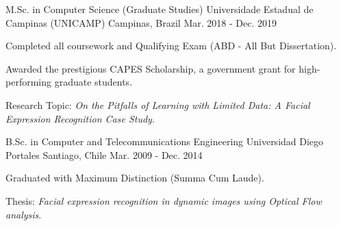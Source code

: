 
\begin{cventries}

\cventry
{M.Sc. in Computer Science (Graduate Studies)} %
{Universidade Estadual de Campinas (UNICAMP)} %
{Campinas, Brazil} %
{Mar. 2018 - Dec. 2019} %
{
\begin{cvitems} %
\item {Completed all coursework and Qualifying Exam (ABD - All But Dissertation).}
\item {Awarded the prestigious CAPES Scholarship, a government grant for high-performing graduate students.}
\item {Research Topic: \emph{On the Pitfalls of Learning with Limited Data: A Facial Expression Recognition Case Study}.}
\end{cvitems}
}

\cventry
{B.Sc. in Computer and Telecommunications Engineering} %
{Universidad Diego Portales} %
{Santiago, Chile} %
{Mar. 2009 - Dec. 2014} %
{
\begin{cvitems} %
\item {Graduated with Maximum Distinction (Summa Cum Laude).}
\item {Thesis: \emph{Facial expression recognition in dynamic images using Optical Flow analysis}.}
\end{cvitems}
}

\end{cventries}